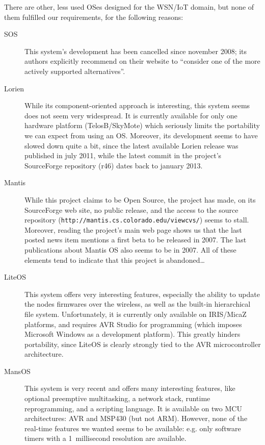 \documentclass[a4paper,twoside]{article}
\begin{document}
There are other, less used OSes designed for the WSN/IoT domain, but none
of them fulfilled our requirements, for the following reasons:
\begin{description}

\item[SOS] \cite{SOS} This system's development has been cancelled since november
           2008; its authors explicitly recommend on their website to
           ``consider one of the more actively supported alternatives''.

\item[Lorien] \cite{LorienOS} While its component-oriented approach is
              interesting, this system seems does not seem very widespread. It is currently available for only 
              one hardware platform (TelosB/SkyMote) which seriously
              limits the portability we can expect from using an OS. 
              Moreover, its development seems to have slowed down quite
              a bit, since the latest available Lorien release was published
              in july 2011, while the latest commit in the project's
              SourceForge repository (r46) dates back to january 2013.

\item[Mantis] \cite{MantisOS} While this project claims to be Open Source,
              the project has made, on its SourceForge web site, no public
              release, and the access to the source repository 
              (\texttt{http://mantis.cs.colorado.edu/viewcvs/}) seems
              to stall. Moreover, reading the project's main web page
              shows us that the last posted news item mentions a first beta
              to be released in 2007. The last publications about
              Mantis OS also seems to be in 2007. All of these elements 
              tend to indicate that this project is abandoned\ldots

\item[LiteOS] \cite{LiteOS} This system offers very interesting features,
              especially the ability to update the nodes firmwares over the wireless,
              as well as the built-in hierarchical file system. Unfortunately,
              it is currently only available on IRIS/MicaZ platforms,
              and requires AVR Studio for programming (which imposes
              Microsoft Windows as a development platform). This
              greatly hinders portability, since LiteOS is clearly strongly
              tied to the AVR microcontroller architecture.

\item[MansOS] \cite{MansOS} This system is very recent and offers many
              interesting features, like optional preemptive multitasking,
              a network stack, runtime reprogramming, and a scripting
              language. It is available on two MCU architectures: AVR and
              MSP430 (but not ARM). However, none of the real-time features
              we wanted seems to be available: e.g. only software timers with
              a 1~millisecond resolution are available.

\end{description}
\end{document}
